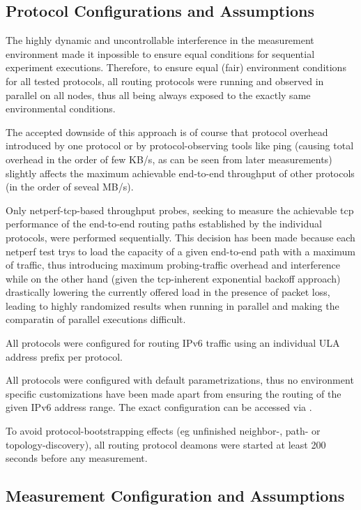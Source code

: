 \documentclass[a4paper,12pt,twoside]{article}
\begin{document}
\subsection{Protocol Configurations and Assumptions}
The highly dynamic and uncontrollable interference in the measurement
environment made it inpossible to ensure equal conditions for
sequential experiment executions. Therefore, to ensure equal (fair)
environment conditions for all tested protocols, all routing protocols
were running and observed in parallel on all nodes, thus all being
always exposed to the exactly same environmental conditions. 

The accepted downside of this approach is of course that protocol
overhead introduced by one protocol or by protocol-observing tools
like ping (causing total overhead in the order of few KB/s, as can be
seen from later measurements) slightly affects the maximum achievable
end-to-end throughput of other protocols (in the order of seveal
MB/s).

Only netperf-tcp-based throughput probes, seeking to measure the
achievable tcp performance of the end-to-end routing paths established
by the individual protocols, were performed sequentially. This
decision has been made because each netperf test trys to load the
capacity of a given end-to-end path with a maximum of traffic, thus
introducing maximum probing-traffic overhead and interference while on
the other hand (given the tcp-inherent exponential backoff approach)
drastically lowering the currently offered load in the presence of
packet loss, leading to highly randomized results when running in
parallel and making the comparatin of parallel executions difficult.


All protocols were configured for routing IPv6 traffic using an
individual ULA address prefix per protocol. 

All protocols were configured with default parametrizations, thus no
environment specific customizations have been made apart from ensuring
the routing of the given IPv6 address range. The exact configuration
can be accessed via \cite{wbm-config}.

To avoid protocol-bootstrapping effects (eg unfinished neighbor-,
path- or topology-discovery), all routing protocol deamons were
started at least 200 seconds before any measurement.

\subsection{Measurement Configuration and Assumptions}
\label{measurement-config}
\end{document}
